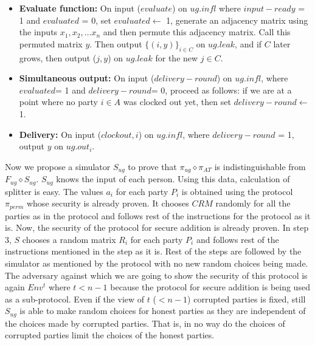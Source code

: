 \documentclass{llncs}
\begin{document}
\begin{framed}
\begin{itemize}
\item \textbf{Evaluate function:} On input ($evaluate$) on $ug.infl$ where $input-ready$ = 1 and $evaluated$ = 0, set $evaluated \leftarrow$ 1, generate an adjacency matrix using the inputs { $x_1, x_2,\dots x_n$ } and then permute this adjacency matrix. Call this permuted matrix $y$. Then output 
$\{(i,y)\}_{i \in C}$ on $ug.leak$, and if $C$ later grows, then output ($j,y$) on $ug.leak$ for the new $j \in C$.

\item \textbf{Simultaneous output:} On input ($delivery-round$) on $ug.infl$, where $evaluated$= 1 and $delivery-round$= 0, proceed as follows: if we are at a point where no party $i \in A$ was clocked out yet, then set $delivery-round\leftarrow$ 1.

\item \textbf{Delivery:} On input ($clockout, i$) on $ug.infl$, where $delivery-round$ = 1, output $y$ on $ug.out_i$.
\end{itemize}
\end{framed}

Now we propose a simulator $S_{ug}$ to prove that $\pi_{ug} \diamond \pi_{AT}$ is indistinguishable from $F_{ug} \diamond S_{ug}$. $S_{ug}$ knows the input of each person. Using this data, calculation of splitter is easy. The values $a_i$ for each party $P_i$ is obtained using the protocol $\pi_{perm}$ whose security is already proven.  It chooses $CRM$ randomly for all the parties as in the protocol and follows rest of the instructions for the protocol as it is. Now, the security of the protocol for secure addition is already proven. In step 3, $S$ chooses a random matrix $R_i$ for each party $P_i$ and follows rest of the instructions mentioned in the step as it is. Rest of the steps are followed by the simulator as mentioned by the protocol with no new random choices being made.\\
The adversary against which we are going to show the security of this protocol is again $Env^t$ where $t < n-1$ because the protocol for secure addition is being used as a sub-protocol. Even if the view of $t$ ($<n-1$) corrupted parties is fixed, still $S_{ug}$ is able to make random choices for honest parties as they are independent of the choices made by corrupted parties. That is, in no way do the choices of corrupted parties limit the choices of the honest parties.

\end{document}
